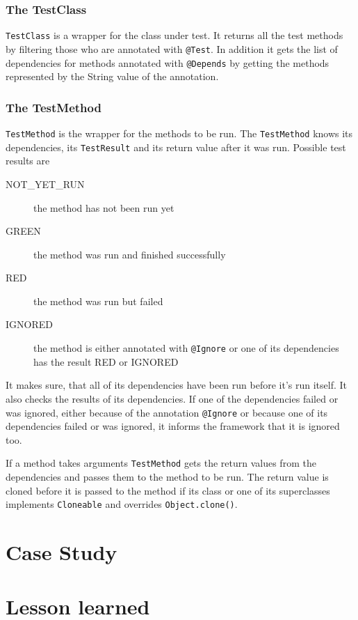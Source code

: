 \documentclass[11pt,a4paper,pdftex]{article}
\begin{document}
\subsubsection{The TestClass}

\verb|TestClass| is a wrapper for the class under test. It returns all the test methods by filtering those who are annotated with \verb|@Test|. In addition it gets the list of dependencies for methods annotated with \verb|@Depends| by getting the methods represented by the String value of the annotation.

\subsubsection{The TestMethod}

\verb|TestMethod| is the wrapper for the methods to be run. The \verb|TestMethod| knows its dependencies, its \verb|TestResult| and its return value after it was run. Possible test results are

\begin{description}
 \item[NOT\_YET\_RUN] the method has not been run yet
 \item[GREEN] the method was run and finished successfully
 \item[RED] the method was run but failed
 \item[IGNORED] the method is either annotated with \verb|@Ignore| or one of its dependencies has the result RED or IGNORED
 \end{description}

It makes sure, that all of its dependencies have been run before it's run itself. It also checks the results of its dependencies. If one of the dependencies failed or was ignored, either because of the annotation \verb|@Ignore| or because one of its dependencies failed or was ignored, it informs the framework that it is ignored too.

If a method takes arguments \verb|TestMethod| gets the return values from the dependencies and passes them to the method to be run. The return value is cloned before it is passed to the method if its class or one of its superclasses implements \verb|Cloneable| and overrides \verb|Object.clone()|.

\section{Case Study}

\section{Lesson learned}
\end{document}
